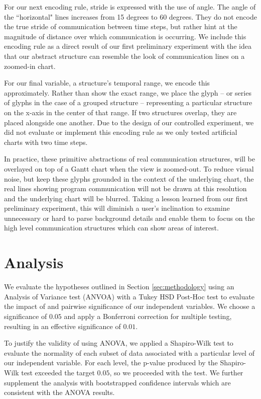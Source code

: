 For our next encoding rule, stride is expressed with the use of angle. The angle of the ``horizontal" lines increases from 15 degrees to 60 degrees. They do not encode the true stride of communication between time steps, but rather hint at the magnitude of distance over which communication is occurring. We include this encoding rule as a direct result of our first preliminary experiment with the idea that our abstract structure can resemble the look of communication lines on a zoomed-in chart.

For our final variable, a structure's temporal range, we encode this approximately. Rather than show the exact range, we place the glyph -- or series of glyphs in the case of a grouped structure -- representing a particular structure on the x-axis in the center of that range. If two structures overlap, they are placed alongside one another. Due to the design of our controlled experiment, we did not evaluate or implement this encoding rule as we only tested artificial charts with two time steps. 

In practice, these primitive abstractions of real communication structures, will be overlayed on top of a Gantt chart when the view is zoomed-out. To reduce visual noise, but keep these glyphs grounded in the context of the underlying chart, the real lines showing program communication will not be drawn at this resolution and the underlying chart will be blurred. Taking a lesson learned from our first preliminary experiment, this will diminish a user's inclination to examine unnecessary or hard to parse background details and enable them to focus on the high level communication structures which can show areas of interest.  




\section{Analysis}
\label{sec:analysis}
    We evaluate the hypotheses outlined in Section \ref{sec:methodology} using an Analysis of Variance test (ANVOA) with a Tukey HSD Post-Hoc test to evaluate the impact of and pairwise significance of our independent variables. We choose a significance of $0.05$ and apply a Bonferroni correction for multiple testing, resulting in an effective significance of $0.01$. 
    
    To justify the validity of using ANOVA, we applied a Shapiro-Wilk test to evaluate the normality of each subset of data associated with a particular level of our independent variable. For each level, the p-value produced by the Shapiro-Wilk test exceeded the target $0.05$, so we proceeded with the test. We further supplement the analysis with bootstrapped confidence intervals which are consistent with the ANOVA results.
    
